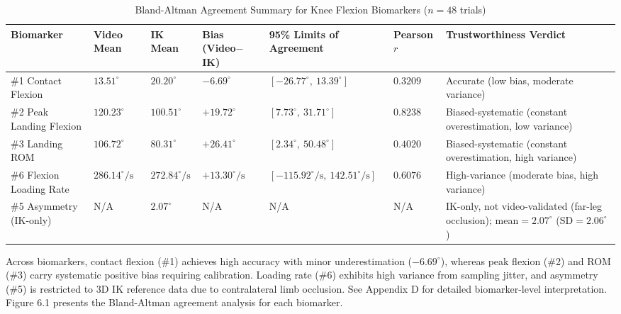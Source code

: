 \begin{table}[htbp]
\centering
\scriptsize
\setlength{\tabcolsep}{3pt}
\renewcommand{\arraystretch}{1.2}
\caption{Bland-Altman Agreement Summary for Knee Flexion Biomarkers ($n = 48$ trials)}
\label{tab:bland-altman-summary}
\begin{tabular}{@{}p{2.6cm} >{\centering\arraybackslash}p{1.5cm} >{\centering\arraybackslash}p{1.3cm} >{\centering\arraybackslash}p{1.8cm} >{\centering\arraybackslash}p{2.4cm} >{\centering\arraybackslash}p{1.4cm} p{3.5cm}@{}}
\hline
\textbf{Biomarker} & \textbf{Video Mean} & \textbf{IK Mean} & \textbf{Bias (Video$-$IK)} & \textbf{95\% Limits of Agreement} & \textbf{Pearson $r$} & \textbf{Trustworthiness Verdict} \\
\hline
\protect\#1 Contact Flexion & $13.51^\circ$ & $20.20^\circ$ & $-6.69^\circ$ & $[-26.77^\circ,\ 13.39^\circ]$ & $0.3209$ & Accurate (low bias, moderate variance) \\
\protect\#2 Peak Landing Flexion & $120.23^\circ$ & $100.51^\circ$ & $+19.72^\circ$ & $[7.73^\circ,\ 31.71^\circ]$ & $0.8238$ & Biased-systematic (constant overestimation, low variance) \\
\protect\#3 Landing ROM & $106.72^\circ$ & $80.31^\circ$ & $+26.41^\circ$ & $[2.34^\circ,\ 50.48^\circ]$ & $0.4020$ & Biased-systematic (constant overestimation, high variance) \\
\protect\#6 Flexion Loading Rate & $286.14^\circ/\text{s}$ & $272.84^\circ/\text{s}$ & $+13.30^\circ/\text{s}$ & $[-115.92^\circ/\text{s},\ 142.51^\circ/\text{s}]$ & $0.6076$ & High-variance (moderate bias, high variance) \\
\protect\#5 Asymmetry (IK-only) & N/A & $2.07^\circ$ & N/A & N/A & N/A & IK-only, not video-validated (far-leg occlusion); mean$=2.07^\circ$ (SD$=2.06^\circ$) \\
\hline
\end{tabular}
\end{table}

Across biomarkers, contact flexion (\protect\#1) achieves high accuracy with minor underestimation ($-6.69^\circ$), whereas peak flexion (\protect\#2) and ROM (\protect\#3) carry systematic positive bias requiring calibration. Loading rate (\protect\#6) exhibits high variance from sampling jitter, and asymmetry (\protect\#5) is restricted to 3D IK reference data due to contralateral limb occlusion. See Appendix D for detailed biomarker-level interpretation.
Figure 6.1 presents the Bland-Altman agreement analysis for each biomarker.

